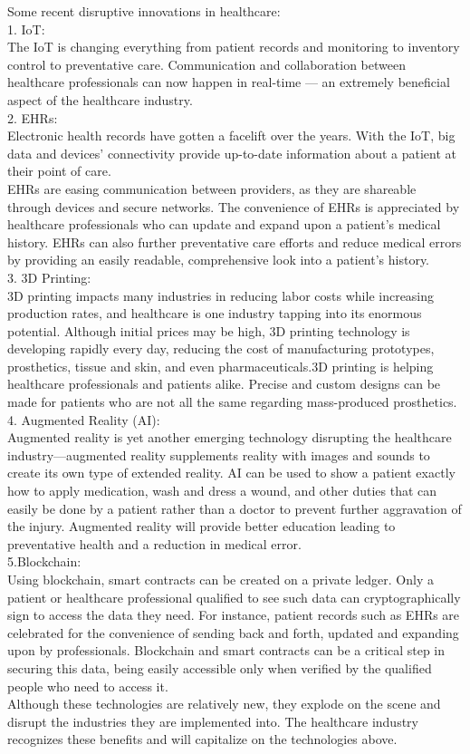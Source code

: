 \documentclass[12pt]{article}
\begin{document}
Some recent disruptive innovations in healthcare:
\\
1. IoT:
\\
The IoT is changing everything from patient records and monitoring to inventory control to preventative care. Communication and collaboration between healthcare professionals can now happen in real-time — an extremely beneficial aspect of the healthcare industry.
\\
2. EHRs:
\\
Electronic health records have gotten a facelift over the years. With the IoT, big data and devices’ connectivity provide up-to-date information about a patient at their point of care.
\\EHRs are easing communication between providers, as they are shareable through devices and secure networks. The convenience of EHRs is appreciated by healthcare professionals who can update and expand upon a patient’s medical history. EHRs can also further preventative care efforts and reduce medical errors by providing an easily readable, comprehensive look into a patient’s history.
\\
3. 3D Printing:
\\
3D printing impacts many industries in reducing labor costs while increasing production rates, and healthcare is one industry tapping into its enormous potential. Although initial prices may be high, 3D printing technology is developing rapidly every day, reducing the cost of manufacturing prototypes, prosthetics, tissue and skin, and even pharmaceuticals.3D printing is helping healthcare professionals and patients alike. Precise and custom designs can be made for patients who are not all the same regarding mass-produced prosthetics. 
\\
4. Augmented Reality (AI):
\\
Augmented reality is yet another emerging technology disrupting the healthcare industry—augmented reality supplements reality with images and sounds to create its own type of extended reality. AI can be used to show a patient exactly how to apply medication, wash and dress a wound, and other duties that can easily be done by a patient rather than a doctor to prevent further aggravation of the injury. Augmented reality will provide better education leading to preventative health and a reduction in medical error.
\\
5.Blockchain:
\\
Using blockchain, smart contracts can be created on a private ledger. Only a patient or healthcare professional qualified to see such data can cryptographically sign to access the data they need. For instance, patient records such as EHRs are celebrated for the convenience of sending back and forth, updated and expanding upon by professionals. Blockchain and smart contracts can be a critical step in securing this data, being easily accessible only when verified by the qualified people who need to access it.
\\
Although these technologies are relatively new, they explode on the scene and disrupt the industries they are implemented into. The healthcare industry recognizes these benefits and will capitalize on the technologies above.
\end{document}
